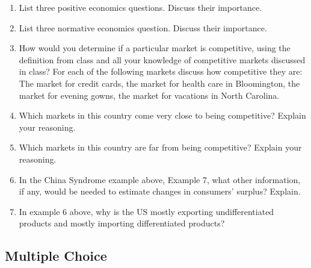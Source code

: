 \documentclass[
]{book}
\providecommand{\tightlist}{%
  \setlength{\itemsep}{0pt}\setlength{\parskip}{0pt}}
\begin{document}
\begin{enumerate}
\def\labelenumi{\arabic{enumi}.}
\tightlist
\item
  List three positive economics questions. Discuss their importance.
\item
  List three normative economics question. Discuss their importance.
\item
  How would you determine if a particular market is competitive, using the definition from class and all your knowledge of competitive markets discussed in class? For each of the following markets discuss how competitive they are: The market for credit cards, the market for health care in Bloomington, the market for evening gowns, the market for vacations in North Carolina.
\item
  Which markets in this country come very close to being competitive? Explain your reasoning.
\item
  Which markets in this country are far from being competitive? Explain your reasoning.
\item
  In the China Syndrome example above, Example 7, what other information, if any, would be needed to estimate changes in consumers' surplus? Explain.
\item
  In example 6 above, why is the US mostly exporting undifferentiated products and mostly importing differentiated products?
\end{enumerate}

\hypertarget{multiple-choice-6}{%
\subsection{Multiple Choice}\label{multiple-choice-6}}
\end{document}
